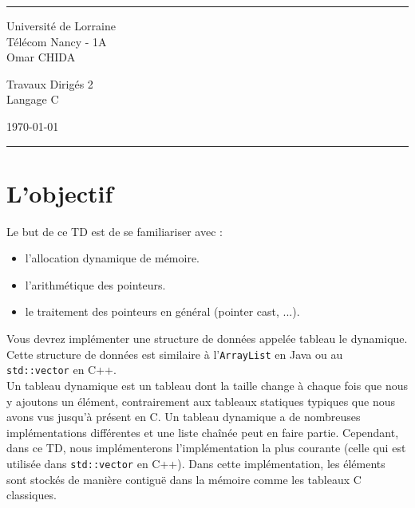 \documentclass[a4paper]{article}
\begin{document}
	
	
	\fancyhead[C]{}
	\hrule \medskip %
	\begin{minipage}{0.295\textwidth} 
		\raggedright
		\footnotesize
		Université de Lorraine\hfill\\   
		Télécom Nancy - 1A\hfill\\
		Omar CHIDA
	\end{minipage}
	\begin{minipage}{0.4\textwidth} 
		\centering 
		\large 
		Travaux Dirigés 2\\ 
		\normalsize 
		Langage C\\ 
	\end{minipage}
	\begin{minipage}{0.295\textwidth} 
		\raggedleft
		\today\hfill\\
	\end{minipage}
	\medskip\hrule 
	\bigskip
	
	\section*{L'objectif}
	Le but de ce TD est de se familiariser avec :
	\begin{itemize}
		\item l'allocation dynamique de mémoire.
		\item l'arithmétique des pointeurs.
		\item le traitement des pointeurs en général (pointer cast, ...).
	\end{itemize}

	Vous devrez implémenter une structure de données appelée tableau le dynamique. Cette structure de données est similaire à l'\texttt{ArrayList} en Java ou au \texttt{std::vector} en C++. \\
	Un tableau dynamique est un tableau dont la taille change à chaque fois que nous y ajoutons un élément, contrairement aux tableaux statiques typiques que nous avons vus jusqu'à présent en C. Un tableau dynamique a de nombreuses implémentations différentes et une liste chaînée peut en faire partie. Cependant, dans ce TD, nous implémenterons l'implémentation la plus courante (celle qui est utilisée dans \texttt{std::vector} en C++). Dans cette implémentation, les éléments sont stockés de manière contiguë dans la mémoire comme les tableaux C classiques.
	
\end{document}
